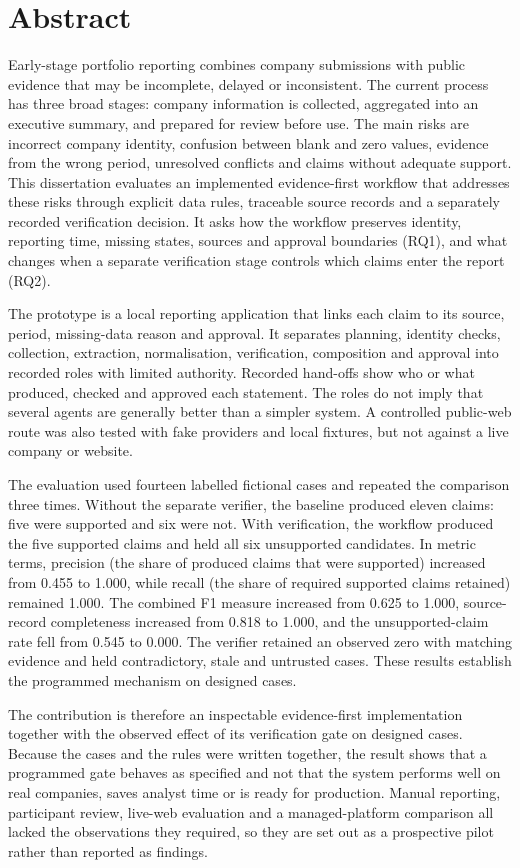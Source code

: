 \chapter*{Abstract}

Early-stage portfolio reporting combines company submissions with public evidence that may be incomplete, delayed or inconsistent. The current process has three broad stages: company information is collected, aggregated into an executive summary, and prepared for review before use. The main risks are incorrect company identity, confusion between blank and zero values, evidence from the wrong period, unresolved conflicts and claims without adequate support. This dissertation evaluates an implemented evidence-first workflow that addresses these risks through explicit data rules, traceable source records and a separately recorded verification decision. It asks how the workflow preserves identity, reporting time, missing states, sources and approval boundaries (RQ1), and what changes when a separate verification stage controls which claims enter the report (RQ2).

The prototype is a local reporting application that links each claim to its source, period, missing-data reason and approval. It separates planning, identity checks, collection, extraction, normalisation, verification, composition and approval into recorded roles with limited authority. Recorded hand-offs show who or what produced, checked and approved each statement. The roles do not imply that several agents are generally better than a simpler system. A controlled public-web route was also tested with fake providers and local fixtures, but not against a live company or website.

The evaluation used fourteen labelled fictional cases and repeated the comparison three times. Without the separate verifier, the baseline produced eleven claims: five were supported and six were not. With verification, the workflow produced the five supported claims and held all six unsupported candidates. In metric terms, precision (the share of produced claims that were supported) increased from 0.455 to 1.000, while recall (the share of required supported claims retained) remained 1.000. The combined F1 measure increased from 0.625 to 1.000, source-record completeness increased from 0.818 to 1.000, and the unsupported-claim rate fell from 0.545 to 0.000. The verifier retained an observed zero with matching evidence and held contradictory, stale and untrusted cases. These results establish the programmed mechanism on designed cases.

The contribution is therefore an inspectable evidence-first implementation together with the observed effect of its verification gate on designed cases. Because the cases and the rules were written together, the result shows that a programmed gate behaves as specified and not that the system performs well on real companies, saves analyst time or is ready for production. Manual reporting, participant review, live-web evaluation and a managed-platform comparison all lacked the observations they required, so they are set out as a prospective pilot rather than reported as findings.
